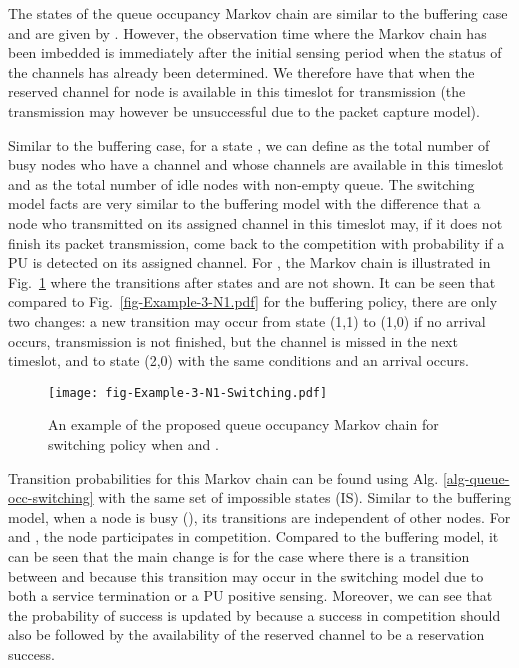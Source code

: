 \documentclass[12pt,journal,oneside,onecolumn]{IEEEtran}
\begin{document}
The states of the queue occupancy Markov chain are similar 
to the buffering case and are given by . 
However, the observation time where the Markov chain has been 
imbedded is immediately after the initial sensing period when 
the status of the channels has already been determined. 
We therefore have that when  the reserved channel for node 
is available in this timeslot for transmission (the transmission may however be unsuccessful due to the packet capture model).

Similar to the buffering case, for a state , we can define  as the 
total number of busy nodes who have a channel and whose channels 
are available in this timeslot and  as the total number of idle nodes with non-empty queue. 
The switching model facts are very similar to the buffering model with the difference 
that a node who transmitted on its assigned channel
in this timeslot may, if it does not finish its packet transmission,
 come back to the competition with probability  if a PU is detected on its assigned channel.
For , the Markov chain is illustrated in Fig.~\ref{fig-Example-3-N1-Switching.pdf} 
where the transitions after states  and  are not shown. 
It can be seen that compared to Fig.~\ref{fig-Example-3-N1.pdf} for the buffering policy, 
there are only two changes: a new transition may occur from state (1,1) to (1,0) 
if no arrival occurs, transmission is not finished, but the channel is missed in the next timeslot, 
and to state (2,0) with the same conditions and an arrival occurs.
\begin{figure}\texttt{[image: fig-Example-3-N1-Switching.pdf]}\caption{An example of the proposed queue occupancy Markov chain for switching policy when  and .}\label{fig-Example-3-N1-Switching.pdf}\end{figure}

Transition probabilities for this Markov chain can be found 
using Alg. \ref{alg-queue-occ-switching} with the same set of impossible states (IS). 
Similar to the buffering model, when a node  is busy (), 
its transitions are independent of other nodes. For  and , 
the node participates in competition. 
Compared to the buffering model, it can be seen that 
the main change is for the case where there is a transition between  and  
because this transition may occur in the switching model due to both a service termination 
or a PU positive sensing. Moreover, we can see that the probability 
of success is updated by  because a success in competition 
should also be followed by the availability of the reserved channel to be a reservation success.
\end{document}
